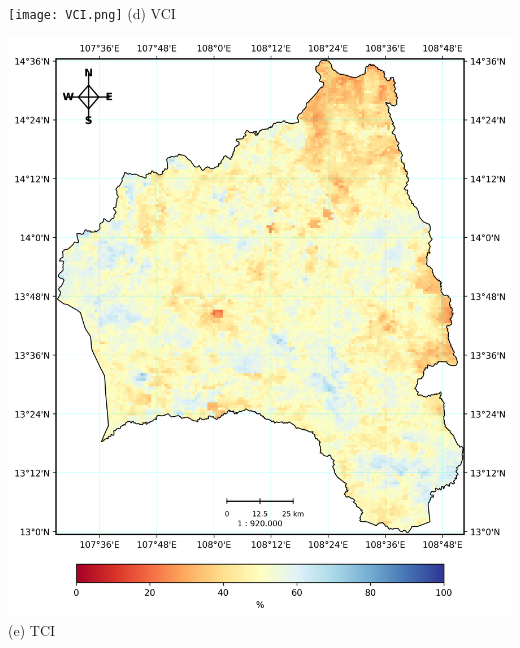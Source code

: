 \documentclass{article}
\begin{document}
\vspace{0.5em}

\noindent
\begin{minipage}{0.31\textwidth}
    \texttt{[image: VCI.png]}
    \centering (d) VCI
\end{minipage}%
\hfill
\begin{minipage}{0.31\textwidth}
    \includegraphics[width=\textwidth]{TCI.png}
    \centering (e) TCI
\end{minipage}%
\hfill
\end{document}
